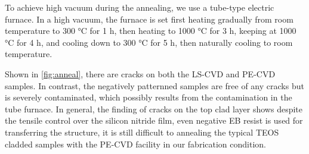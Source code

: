 To achieve high vacuum during the annealing, we use a tube-type electric furnace. In a high vacuum, the furnace is set first heating gradually  from room temperature to 300 \si{\celsius} for 1 h, then heating to 1000 \si{\celsius} for 3 h, keeping at 1000 \si{\celsius} for 4 h, and cooling down to 300 \si{\celsius} for 5 h, then naturally cooling to room temperature. 

Shown in \autoref{fig:anneal}, there are cracks on both the LS-CVD and PE-CVD samples. In contrast, the negatively patternned samples are free of any cracks but is severely contaminated, which possibly results from the contamination in the tube furnace. 
In general, the finding of cracks on the top clad layer shows despite the tensile control over the silicon nitride film, even negative EB resist is used for transferring the structure, it is still difficult to annealing the typical TEOS cladded samples with the PE-CVD facility in our fabrication condition.

